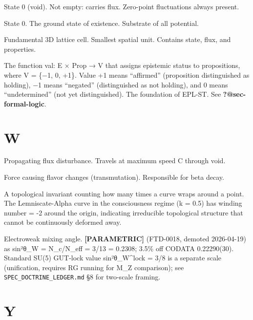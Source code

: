 \documentclass[
  11pt,
  letterpaper,
  twoside,
  openany]{book}
\makeatletter
\providecommand{\tightlist}{%
  \setlength{\itemsep}{0pt}\setlength{\parskip}{0pt}}
\let\orig@section\section
\renewcommand{\section}{\needspace{8\baselineskip}\orig@section}
\makeatother
\begin{document}
\begin{description}
\tightlist
\item[\textbf{Vacuum}]
State 0 (void). Not empty: carries flux. Zero-point fluctuations always
present.
\item[\textbf{Void}]
State 0. The ground state of existence. Substrate of all potential.
\item[\textbf{Voxel}]
Fundamental 3D lattice cell. Smallest spatial unit. Contains state,
flux, and properties.
\item[\textbf{Valuation Function (val)}]
The function val: E × Prop → V that assigns epistemic status to
propositions, where V = \{−1, 0, +1\}. Value +1 means ``affirmed''
(proposition distinguished as holding), −1 means ``negated''
(distinguished as not holding), and 0 means ``undetermined'' (not yet
distinguished). The foundation of EPL-ST. See
\textbf{?@sec-formal-logic}.
\end{description}

\section{W}\label{w}

\begin{description}
\tightlist
\item[\textbf{Wave}]
Propagating flux disturbance. Travels at maximum speed C through void.
\item[\textbf{Weak Force}]
Force causing flavor changes (transmutation). Responsible for beta
decay.
\item[\textbf{Winding Number}]
A topological invariant counting how many times a curve wraps around a
point. The Lemniscate-Alpha curve in the consciousness regime (k = 0.5)
has winding number = -2 around the origin, indicating irreducible
topological structure that cannot be continuously deformed away.
\item[\textbf{Weinberg Angle (θ\_W)}]
Electroweak mixing angle. \textbf{{[}PARAMETRIC{]}} (FTD-0018, demoted
2026-04-19) as sin²θ\_W = N\_c/N\_eff = 3/13 = 0.2308; 3.5\% off CODATA
0.22290(30). Standard SU(5) GUT-lock value sin²θ\_W\^{}lock = 3/8 is a
separate scale (unification, requires RG running for M\_Z comparison);
see \texttt{SPEC\_DOCTRINE\_LEDGER.md} §8 for two-scale framing.
\end{description}

\section{Y}\label{y}
\end{document}

